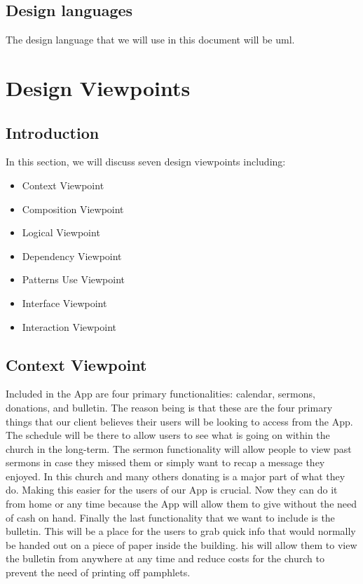 \documentclass[letterpaper,10pt,draftclsnofoot,onecolumn,titlepage]{IEEEtran}
\begin{document}
		\subsection{Design languages}
		The design language that we will use in this document will be \gls{uml}.

	\section{Design Viewpoints}

		\subsection{Introduction}
		In this section, we will discuss seven design viewpoints including:
			\begin{itemize}
				\item{Context Viewpoint}
				\item{Composition Viewpoint}
				\item{Logical Viewpoint}
				\item{Dependency Viewpoint}
				\item{Patterns Use Viewpoint}
				\item{Interface Viewpoint}
				\item{Interaction Viewpoint}
			\end{itemize}

		\subsection{Context Viewpoint}
		Included in the \gls{App} are four primary functionalities: calendar, sermons, donations, and bulletin.
		The reason being is that these are the four primary things that our client believes their users will be looking to access from the \gls{App}.
		The schedule will be there to allow users to see what is going on within the church in the long-term.
		The sermon functionality will allow people to view past sermons in case they missed them or simply want to recap a message they enjoyed.
		In this church and many others donating is a major part of what they do.
		Making this easier for the users of our \gls{App} is crucial.
		Now they can do it from home or any time because the \gls{App} will allow them to give without the need of cash on hand.
		Finally the last functionality that we want to include is the bulletin.
		This will be a place for the users to grab quick info that would normally be handed out on a piece of paper inside the building.
		his will allow them to view the bulletin from anywhere at any time and reduce costs for the church to prevent the need of printing off pamphlets.
\end{document}
